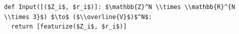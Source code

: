 \documentclass[border=10pt]{standalone}
\begin{document}
\begin{lstlisting}
def Input([($Z_i$, $r_i$)]: $\mathbb{Z}^N \\times \\mathbb{R}^{N \\times 3}$) $\to$ ($\\overline{V}$)$^N$:
  return [featurize($Z_i$, $r_i$)]
\end{lstlisting}
\end{document}
